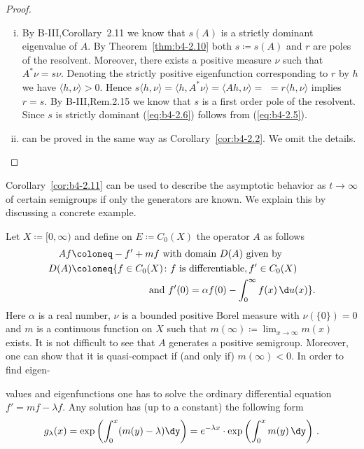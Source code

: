 \begin{proof}
	\begin{enumerate}[(i), wide]
		\item 
		By B-III,Corollary~2.11 we know that $s(A)$ is a strictly dominant eigenvalue of $A$. By Theorem~\ref{thm:b4-2.10} both $s  \coloneq  s(A)$ and $r$ are poles of the resolvent. Moreover, there exists a positive measure $\nu$ such that $A^*\nu = s\nu$. Denoting the strictly positive eigenfunction corresponding to $r$ by $h$ we have $\langle h,\nu \rangle > 0$. Hence $s\langle h,\nu \rangle = \langle h,A^*\nu \rangle = \langle Ah,\nu \rangle =$ $= r\langle h,\nu \rangle$ implies $r = s$. By B-III,Rem.2.15 we know that $s$ is a first order pole of the resolvent. Since $s$ is strictly dominant (\ref{eq:b4-2.6}) follows from (\ref{eq:b4-2.5}).

		\item 
		can be proved in the same way as Corollary~\ref{cor:b4-2.2}. We omit the details.
	\end{enumerate}
\end{proof}

Corollary~\ref{cor:b4-2.11} can be used to describe the asymptotic behavior as $t \to \infty$ of certain semigroups if only the generators are known. We explain this by discussing a concrete example.
\begin{example}\label{ex:b4-2.12}
	Let $X  \coloneq  [0,\infty)$ and define on $E  \coloneq  C_{0}(X)$ the operator $A$ as follows
	\begin{equation}\label{eq:b4-2.8}
		\begin{aligned}
		Af & \coloneq -f' + mf \text{ with domain } D(A) \text{ given by}	\\
		D(A) & \coloneq  \{f \in C_{0}(X) \colon f \text{ is differentiable}, f' \in C_{0}(X)\\
		& \phantom{aaaaaaaaaaaaaaa} \text{and } f'(0) = \alpha f(0) - \int_0^{\infty} f(x) \, \d
u(x) \} \text{.}
		\end{aligned}
	\end{equation}
	Here $\alpha$ is a real number, $\nu$ is a bounded positive Borel measure with $\nu(\{0\}) = 0$ and $m$ is a continuous function on $X$ such that $m(\infty)  \coloneq  \lim_{x \to \infty}m(x)$ exists. It is not difficult to see that $A$ generates a positive semigroup. Moreover, one can show that it is quasi-compact if (and only if) $m(\infty) < 0$. In order to find eigen-
\end{example}
%
%
%
\newpage 
%
values and eigenfunctions one has to solve the ordinary differential equation $f' = mf - \lambda f$. Any solution has (up to a constant) the following form
\begin{equation}\label{eq:b4-2.9}
	g_{\lambda}(x) = \exp\left(\int_0^x(m(y) - \lambda)\dy \right) = e^{-\lambda x} \cdot \exp\left(\int_0^x m(y) \, \dy \right)\,.
\end{equation}

